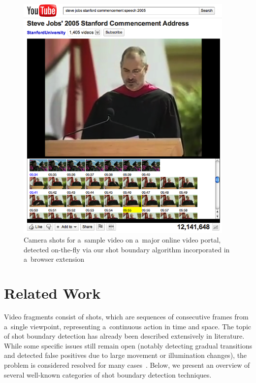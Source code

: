 \begin{figure}
\centering
    \includegraphics[width=0.95\textwidth,height=0.9\textheight,keepaspectratio]{./stevejobs.png}
  \caption[Camera shots for a~sample video on  
    a~major online video portal]
    {Camera shots for a~sample video on 
    a~major online video portal, detected on-the-fly via
    our shot boundary algorithm incorporated
    in a~browser extension}
  \label{fig:screenshotcamerashots}
\end{figure}

\section{Related Work} 
Video fragments consist of shots, which are sequences of
consecutive frames from a~single viewpoint,
representing a~continuous action in time and space.
The topic of shot boundary detection has already been described
extensively in literature.
While some specific issues still remain open
(notably detecting gradual transitions and detected false positives
due to large movement or illumination changes),
the problem is considered resolved for many
cases~\cite{yuan2007shotboundary,hanjalic2002shotboundary}.
Below, we present an overview of several well-known categories of shot boundary detection techniques.

